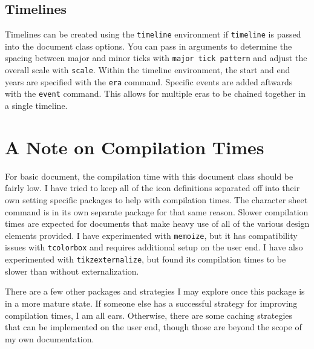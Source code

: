 \documentclass[article,stormlight,timeline,statblock]{plotweaver}
\begin{document}
\subsection{Timelines}
Timelines can be created using the \texttt{timeline} environment if \texttt{timeline} is passed into the document class options. You can pass in arguments to determine the spacing between major and minor ticks with \texttt{major tick pattern} and adjust the overall scale with \texttt{scale}. Within the timeline environment, the start and end years are specified with the \texttt{era} command. Specific events are added aftwards with the \texttt{event} command. This allows for multiple eras to be chained together in a single timeline. 
\begin{figure}
    \begin{timeline}[major tick pattern=5, scale=0.2]
    \end{timeline}
\end{figure}

\section{A Note on Compilation Times}
For basic document, the compilation time with this document class should be fairly low. I have tried to keep all of the icon definitions separated off into their own setting specific packages to help with compilation times. The character sheet command is in its own separate package for that same reason. Slower compilation times are expected for documents that make heavy use of all of the various design elements provided. I have experimented with \texttt{memoize}, but it has compatibility issues with \texttt{tcolorbox} and requires additional setup on the user end. I have also experimented with \texttt{tikzexternalize}, but found its compilation times to be slower than without externalization.

There are a few other packages and strategies I may explore once this package is in a more mature state. If someone else has a successful strategy for improving compilation times, I am all ears. Otherwise, there are some caching strategies that can be implemented on the user end, though those are beyond the scope of my own documentation.
\end{document}

